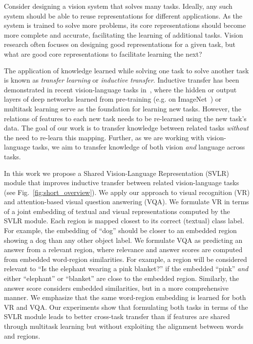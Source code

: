 Consider designing a vision system that solves many tasks. Ideally, any such system should be able to reuse representations for different applications. As the system is trained to solve more problems, its core representations should become more complete and accurate, facilitating the learning of additional tasks. Vision research often focuses on designing good representations for a given task, but what are good core representations to facilitate learning the next?

The application of knowledge learned while solving one task to solve another task
is known as \textit{transfer learning} or \textit{inductive transfer}. Inductive transfer has been demonstrated in recent vision-language tasks in~\cite{li2016learning,lu2016hierarchical,jabri2016revisiting,fukui2016multimodal,shih2016look,ilievski2016focused}, where the hidden or output layers of deep networks learned from pre-training (e.g. on ImageNet~\cite{deng2009imagenet}) or multitask learning serve as the foundation for learning new tasks. However, the relations of features to each new task needs to be re-learned using the new task's data. The goal of our work is to transfer knowledge between related tasks \emph{without} the need to re-learn this mapping. Further, as we are working with vision-language tasks, we aim to transfer knowledge of both vision \emph{and} language across tasks.



In this work we propose a Shared Vision-Language Representation (SVLR) module that improves inductive transfer between related vision-language tasks (see Fig.~\ref{fig:short_overview}).  We apply our approach to visual recognition (VR) and attention-based visual question answering (VQA). We formulate VR in terms of
a joint embedding of textual and visual representations computed by the SVLR module. Each region is mapped closest to its correct (textual) class label.  For example, the embedding of ``dog'' should be closer to an embedded region showing a dog than any other object label.  We formulate VQA as predicting an answer from a relevant region, where relevance and answer scores are computed from embedded word-region similarities.  For example, a region will be considered relevant to ``Is the elephant wearing a pink blanket?'' if the embedded ``pink'' \textit{and} either ``elephant'' or ``blanket'' are close to the embedded region. Similarly, the answer score considers embedded similarities, but in a more comprehensive manner. We emphasize that the same word-region embedding is learned for both VR and VQA.  Our experiments show that formulating both tasks in terms of the SVLR module leads to better cross-task transfer than if features are shared through multitask learning but without exploiting the alignment between words and regions. 


